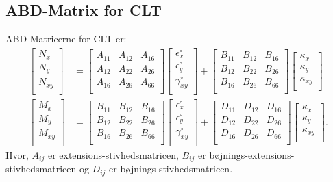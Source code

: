 \subsection{ABD-Matrix for CLT}
ABD-Matricerne for CLT er:
\begin{align*}
  \begin{bmatrix}
    N_x\\
  N_y\\
  N_{xy}\\
  \end{bmatrix} &= \begin{bmatrix}
    A_{11} & A_{12} & A_{16}\\
  A_{12} & A_{22} & A_{26}\\
  A_{16} & A_{26} & A_{66}\\
  \end{bmatrix} \begin{bmatrix}
    \epsilon_x^{\circ}\\
  \epsilon_y^{\circ}\\
  \gamma_{xy}^{\circ}\\
  \end{bmatrix} + \begin{bmatrix}
    B_{11} & B_{12} & B_{16}\\
  B_{12} & B_{22} & B_{26}\\
  B_{16} & B_{26} & B_{66}\\
  \end{bmatrix} \begin{bmatrix}
    \kappa_x\\
  \kappa_y\\
  \kappa_{xy}\\
  \end{bmatrix} \\
  \begin{bmatrix}
    M_x\\
  M_y\\
  M_{xy}\\
\end{bmatrix} &= \begin{bmatrix}
  B_{11} & B_{12} & B_{16}\\
B_{12} & B_{22} & B_{26}\\
B_{16} & B_{26} & B_{66}\\
\end{bmatrix} \begin{bmatrix}
  \epsilon_x^{\circ}\\
\epsilon_y^{\circ}\\
\gamma_{xy}^{\circ}\\
\end{bmatrix} + \begin{bmatrix}
  D_{11} & D_{12} & D_{16}\\
D_{12} & D_{22} & D_{26}\\
D_{16} & D_{26} & D_{66}\\
\end{bmatrix} \begin{bmatrix}
  \kappa_x\\
\kappa_y\\
\kappa_{xy}\\
\end{bmatrix}
.\end{align*}
Hvor, $A_{ij}$ er extensions-stivhedsmatricen, $B_{ij}$ er bøjnings-extensions-stivhedsmatricen og $D_{ij}$ er bøjnings-stivhedsmatricen.
